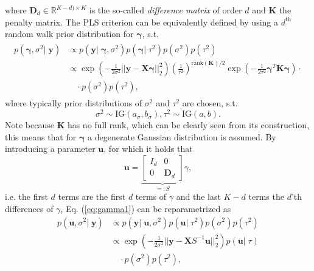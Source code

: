 \documentclass[12pt,letterpaper]{article}
\numberwithin{equation}{subsection}
\begin{document}
where $\mathbf{D}_d \in \mathbb{R}^{K-d) \times K}$ is the so-called \textit{difference matrix} of order $d$ and $\mathbf{K}$ the penalty matrix. The PLS criterion can be equivalently defined by using a $d^{\text{th}}$ random walk prior distribution for $\mathbf{\gamma}$, s.t. 
\begin{align}
\begin{split}
p(\mathbf{\gamma}, \sigma^2 | \; \mathbf{y}) & \propto  p(\mathbf{y} | \; \mathbf{\gamma}, \sigma^2) p(\mathbf{\gamma} | \; \tau^2) p(\sigma^2) p(\tau^2) \\
& \propto  \exp(-\frac{1}{2\sigma^2}||\mathbf{y} - \mathbf{X}\mathbf{\gamma}||^2_2)
(\frac{1}{\tau^2})^{\text{rank}(\mathbf{K})/2}\exp(-\frac{1}{2\tau^2}\mathbf{\gamma}^T\mathbf{K}\mathbf{\gamma}) \cdot \\
 &  \quad\cdot p(\sigma^2) p(\tau^2),
\end{split}
\label{eq:gamma1}
\end{align}
where typically prior distributions of $\sigma^2$ and $\tau^2$ are chosen, s.t. 
\begin{equation}
\sigma^2 \sim \text{IG}(a_\sigma, b_\sigma), \tau^2 \sim \text{IG}(a, b).
\end{equation}
Note because $\mathbf{K}$ has no full rank, which can be clearly seen from its construction, this means that for $\mathbf{\gamma}$ a degenerate Gaussian distribution is assumed. 
By introducing a parameter $\mathbf{u}$, for which it holds that \begin{equation}
\mathbf{u} = \underbrace{\begin{bmatrix}I_{d} & 0 \\ 0 &\mathbf{D}_d\end{bmatrix}}_{=:S}\gamma,
\label{eq:urp}
\end{equation} 
i.e. the first $d$ terms are the first $d$ terms of $\gamma$ and the last $K-d$ terms the $d$'th differences of $\gamma$, Eq. (\ref{eq:gamma1}) can be reparametrized as 
\begin{equation}
\begin{split}
p(\mathbf{u}, \sigma^2 | \; \mathbf{y}) & \propto  p(\mathbf{y} | \; \mathbf{u}, \sigma^2) p(\mathbf{u} | \; \tau^2) p(\sigma^2) p(\tau^2) \\
& \propto  \exp(-\frac{1}{2\sigma^2}||\mathbf{y} - \mathbf{X}S^{-1}\mathbf{u}||^2_2)
p(\mathbf{u}|\;\tau) \\
 &  \quad\cdot p(\sigma^2) p(\tau^2),
\end{split}
\end{equation}
\end{document}
